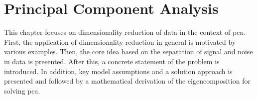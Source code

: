 \documentclass[../../../main.tex]{subfiles}
\begin{document}
\section{Principal Component Analysis}\label{sec:principal_component_analysis}
This chapter focuses on dimensionality reduction of data in the context of \gls{pca}. First, the application of dimensionality reduction in general is motivated by various examples. Then, the core idea based on the separation of signal and noise in data is presented. After this, a concrete statement of the problem is introduced. In addition, key model assumptions and a solution approach is presented and followed by a mathematical derivation of the eigencomposition for solving \gls{pca}.






\end{document}

